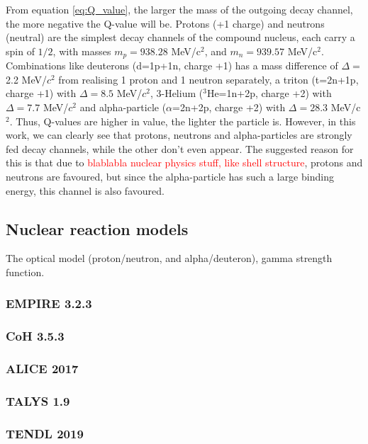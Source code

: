 From equation \ref{eq:Q_value}, the larger the mass of the outgoing decay channel, the more negative the Q-value will be. Protons (+1 charge) and neutrons (neutral) are the simplest decay channels of the compound nucleus, each carry a spin of $1/2$, with masses $m_p=938.28$ MeV/c$^2$, and $m_n=939.57$ MeV/c$^2$. Combinations like deuterons (d=1p+1n, charge +1) has a mass difference of $\Delta=$2.2 MeV/$c^2$ from realising 1 proton and 1 neutron separately, a triton (t=2n+1p, charge +1) with $\Delta=8.5$ MeV/$c^2$,  3-Helium ($^{3}$He=1n+2p, charge +2) with $\Delta=7.7$ MeV/$c^2$ and alpha-particle ($\alpha$=2n+2p, charge +2) with $\Delta=28.3$ MeV/c$^2$. Thus, Q-values are higher in value, the lighter the particle is. However, in this work, we can clearly see that protons, neutrons and alpha-particles are strongly fed decay channels, while the other don't even appear. The suggested reason for this is that due to \textcolor{red}{blablabla nuclear physics stuff, like shell structure}, protons and neutrons are favoured, but since the alpha-particle has such a large binding energy, this channel is also favoured.  

\subsection{Nuclear reaction models}

The optical model (proton/neutron, and alpha/deuteron), gamma strength function. 

\subsubsection{EMPIRE 3.2.3}
\subsubsection{CoH 3.5.3}
\subsubsection{ALICE 2017}
\subsubsection{TALYS 1.9}
\subsubsection{TENDL 2019}




